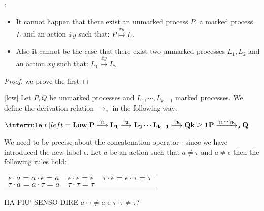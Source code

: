 \begin{lemma}\label{lemmacom3}
  :\begin{itemize}
    \item
      It cannot happen that there exist an unmarked process $P$, a marked process $L$ and an action $\overline{x}y$ such that: $P\stackrel{\overline{x}y}{\longmapsto}L$. 
    \item
      Also it cannot be the case that there exist two unmarked processes $L_{1}, L_{2}$ and an action $\overline{x}y$ such that: $L_{1}\stackrel{\overline{x}y}{\longmapsto}L_{2}$
  \end{itemize}
  \begin{proof}
    we prove the first 
  \end{proof}
\end{lemma}

  
\begin{definition}\ref{low}
  Let $P, Q$ be unmarked processes and $L_{1}, \cdots, L_{k-1}$ marked processes. We define the derivation relation $\rightarrow_{s}$ in the following way:
  \begin{center}
    $\inferrule* [left=\bf{Low}]{
	P \stackrel{\gamma_{1}}{\longmapsto} L_{1} \stackrel{\gamma_{2}}{\longmapsto} L_{2} \cdots L_{k-1} \stackrel{\gamma_{k}}{\longmapsto} Q
      \\
	k\geq 1
    }{
      P \xrightarrow{\gamma_{1} \cdots \gamma_{k}}_{s}  Q
    }$
  \end{center}
  We need to be precise about the concatenation operator $\cdot$ since we have introduced the new label $\epsilon$. Let $a$ be an action such that $a\neq \tau$ and $a\neq \epsilon$ then the following rules hold:
  \begin{center}
      \begin{tabular}{lll}
	  $\epsilon \cdot a = a \cdot \epsilon = a$
	&
	  $\epsilon \cdot \epsilon = \epsilon$
	&
	  $\tau \cdot \epsilon = \epsilon \cdot \tau = \tau$
	\\
	  $\tau \cdot a = a \cdot \tau = a$
	&
	  $\tau \cdot \tau = \tau$
	&
      \end{tabular}
  \end{center}

  HA PIU' SENSO DIRE $a \cdot \tau \neq a$ e $\tau \cdot \tau \neq \tau$?

\end{definition}

